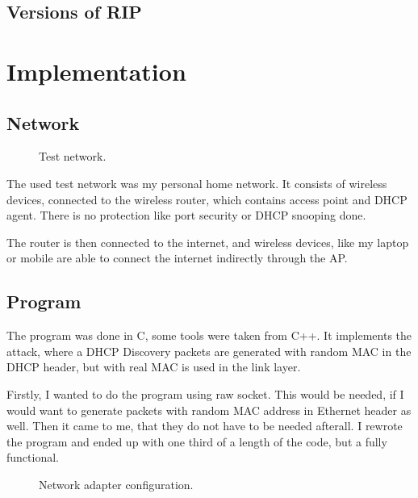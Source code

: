 \documentclass[10pt,a4paper,titlepage]{article}
\begin{document}
    \subsection*{Versions of RIP}


    
    
    \section*{Implementation}
    
    \subsection*{Network}
    \begin{figure}[h!]
        \begin{center}
            \caption{ Test network. \label{fig:network} \cite{laptop}}
        \end{center}
    \end{figure}
    The used test network was my personal home network. It consists of wireless
    devices, connected to the wireless router, which contains access point and DHCP agent.
    There is no protection like port security or DHCP snooping done.
    
    The router is then connected to the internet, and wireless devices, like my laptop
    or mobile are able to connect the internet indirectly through the AP.
    
    \subsection*{Program}
    
    The program was done in C, some tools were taken from C++. It implements the attack,
    where a DHCP Discovery packets are generated with random MAC in the DHCP header,
    but with real MAC is used in the link layer.
    
    Firstly, I wanted to do the program using raw socket. This would be needed, if 
    I would want to generate packets with random MAC address in Ethernet header as well.
    Then it came to me, that they do not have to be needed afterall. I rewrote the
    program and ended up with one third of a length of the code, but a fully functional.
    
    \begin{figure}[h!]
        \begin{center}
            \caption{ Network adapter configuration. \label{fig:ifconfig}}
        \end{center}
    \end{figure}
    
\end{document}
